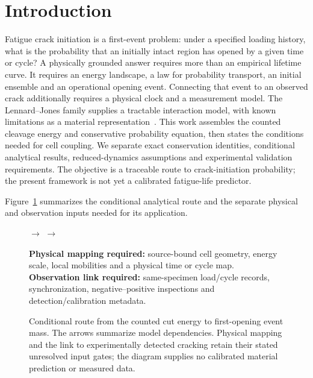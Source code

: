 \documentclass[11pt]{article}
\begin{document}
\section{Introduction}
Fatigue crack initiation is a first-event problem: under a specified loading
history, what is the probability that an initially intact region has opened
by a given time or cycle? A physically grounded answer requires more than
an empirical lifetime curve. It requires an energy landscape, a law for
probability transport, an initial ensemble and an operational opening event.
Connecting that event to an observed crack additionally requires a physical
clock and a measurement model.
The Lennard--Jones family supplies a tractable interaction model, with known
limitations as a material representation~\cite{SchwerdtfegerWales2024}.
This work assembles the counted cleavage energy and conservative
probability equation, then states the conditions needed for cell coupling.
We separate exact conservation identities, conditional analytical results,
reduced-dynamics assumptions and experimental validation requirements.
The objective is a traceable route to crack-initiation probability;
the present framework is not yet a calibrated fatigue-life predictor.

Figure~\ref{fig:conditional-route} summarizes the conditional analytical route
and the separate physical and observation inputs needed for its application.
\begin{figure}[tbp]
\centering
\setlength{\fboxsep}{5pt}
\footnotesize
{}
\hfill$\longrightarrow$\hfill
{}
\hfill$\longrightarrow$\hfill
{}
\par\medskip
\begin{minipage}{0.96\linewidth}\raggedright
\textbf{Physical mapping required:} source-bound cell geometry, energy scale,
local mobilities and a physical time or cycle map.\\[3pt]
\textbf{Observation link required:} same-specimen load/cycle records,
synchronization, negative--positive inspections and detection/calibration metadata.
\end{minipage}
\caption{Conditional route from the counted cut energy to first-opening event mass.
The arrows summarize model dependencies. Physical mapping and the link to
experimentally detected cracking retain their stated unresolved input gates;
the diagram supplies no calibrated material prediction or measured data.}
\label{fig:conditional-route}
\end{figure}
\end{document}
